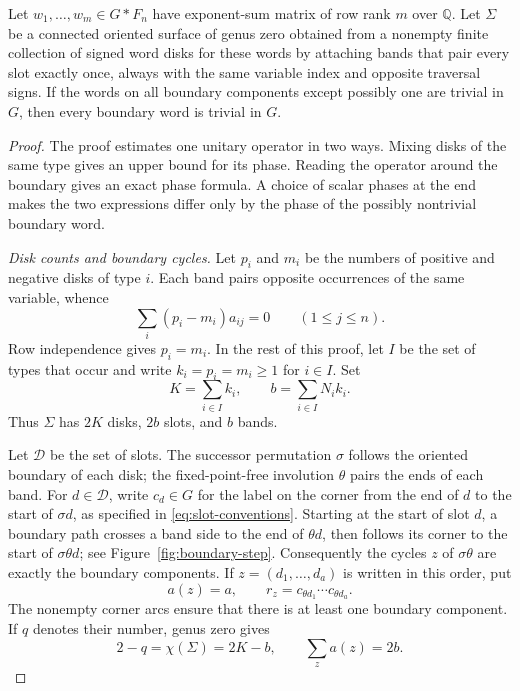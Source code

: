 \begin{proposition}\label{prop:planar}
Let $w_1,\ldots,w_m\in G*F_n$ have exponent-sum matrix of row rank $m$
over $\mathbb Q$.  Let $\Sigma$ be a connected oriented surface of genus
zero obtained from a nonempty finite collection of signed word disks for
these words by attaching bands that pair every slot exactly once, always
with the same variable index and opposite traversal signs.  If the words
on all boundary components except possibly one are trivial in $G$, then
every boundary word is trivial in $G$.
\end{proposition}

\begin{proof}
The proof estimates one unitary operator in two ways.  Mixing disks of
the same type gives an upper bound for its phase.  Reading the operator
around the boundary gives an exact phase formula.  A choice of scalar
phases at the end makes the two expressions differ only by the phase of
the possibly nontrivial boundary word.

\smallskip\noindent
\emph{Disk counts and boundary cycles.}
Let $p_i$ and $m_i$ be the numbers of positive and negative disks of type
$i$.  Each band pairs opposite occurrences of the same variable, whence
\[
 \sum_i(p_i-m_i)a_{ij}=0\qquad(1\leq j\leq n).
\]
Row independence gives $p_i=m_i$.  In the rest of this proof, let $I$ be
the set of types that occur and write $k_i=p_i=m_i\geq1$ for $i\in I$.
Set
\begin{equation}\label{eq:disk-band-counts}
 K=\sum_{i\in I}k_i,\qquad b=\sum_{i\in I}N_i k_i.
\end{equation}
Thus $\Sigma$ has $2K$ disks, $2b$ slots, and $b$ bands.

Let $\mathcal D$ be the set of slots.  The successor permutation
$\sigma$ follows the oriented boundary of each disk; the fixed-point-free
involution $\theta$ pairs the ends of each band.  For $d\in\mathcal D$,
write $c_d\in G$ for the label on the corner from the end of $d$ to the
start of $\sigma d$, as specified in \eqref{eq:slot-conventions}.
Starting at the start of slot $d$, a boundary path crosses a band side to
the end of $\theta d$, then follows its corner to the start of
$\sigma\theta d$; see Figure~\ref{fig:boundary-step}.  Consequently the
cycles $z$ of $\sigma\theta$ are exactly the boundary components.  If
$z=(d_1,\ldots,d_a)$ is written in this order, put
\begin{equation}\label{eq:boundary-word}
 a(z)=a,\qquad r_z=c_{\theta d_1}\cdots c_{\theta d_a}.
\end{equation}
The nonempty corner arcs ensure that there is at least one boundary
component.  If $q$ denotes their number, genus zero gives
\begin{equation}\label{eq:planar-euler}
 2-q=\chi(\Sigma)=2K-b,\qquad \sum_z a(z)=2b.
\end{equation}


\end{proof}
